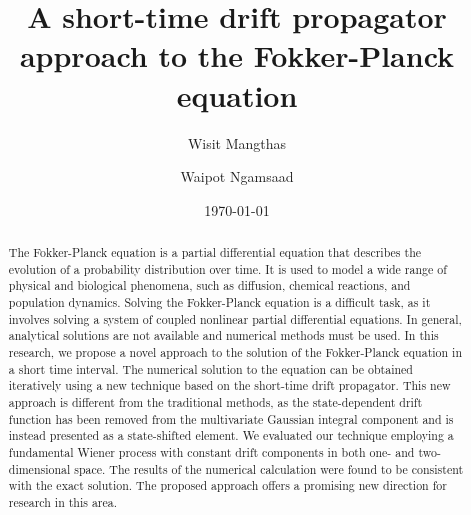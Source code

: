 \documentclass[aps,pre,reprint,superscriptaddress,showpacs,amsmath
,floatfix
]{revtex4-2}
\begin{document}

\title{A short-time drift propagator approach to the Fokker-Planck equation}




\author{Wisit Mangthas}

\author{Waipot Ngamsaad}



\date{\today}

\begin{abstract}
The Fokker-Planck equation is a partial differential equation that describes the evolution of a probability distribution over time. It is used to model a wide range of physical and biological phenomena, such as diffusion, chemical reactions, and population dynamics. Solving the Fokker-Planck equation is a difficult task, as it involves solving a system of coupled nonlinear partial differential equations. In general, analytical solutions are not available and numerical methods must be used. In this research, we propose a novel approach to the solution of the Fokker-Planck equation in a short time interval. The numerical solution to the equation can be obtained iteratively using a new technique based on the short-time drift propagator. This new approach is different from the traditional methods, as the state-dependent drift function has been removed from the multivariate Gaussian integral component and is instead presented as a state-shifted element. We evaluated our technique employing a fundamental Wiener process with constant drift components in both one- and two-dimensional space. The results of the numerical calculation were found to be consistent with the exact solution. The proposed approach offers a promising new direction for research in this area.

\end{abstract}
\end{document}

